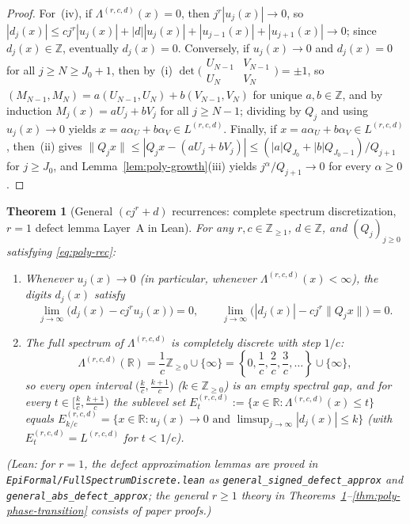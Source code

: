 \documentclass[11pt]{article}
\newtheorem{theorem}{Theorem}
\theoremstyle{definition}
\theoremstyle{remark}
\newcommand{\R}{\mathbb{R}}
\newcommand{\Z}{\mathbb{Z}}
\newcommand{\Lam}{\Lambda}
\begin{document}
\begin{proof}
For~(iv), if $\Lam^{(r,c,d)}(x)=0$, then $j^r|u_j(x)|\to0$, so
$|d_j(x)|\le cj^r|u_j(x)|+|d||u_j(x)|+|u_{j-1}(x)|+|u_{j+1}(x)|\to0$; since
$d_j(x)\in\Z$, eventually $d_j(x)=0$. Conversely, if $u_j(x)\to0$ and $d_j(x)=0$
for all $j\ge N\ge J_0+1$, then by~(i)
$\det\bigl(\begin{smallmatrix}U_{N-1}&V_{N-1}\\U_N&V_N\end{smallmatrix}\bigr)=\pm1$,
so $(M_{N-1},M_N)=a(U_{N-1},U_N)+b(V_{N-1},V_N)$ for unique $a,b\in\Z$, and by
induction $M_j(x)=aU_j+bV_j$ for all $j\ge N-1$; dividing by $Q_j$ and using
$u_j(x)\to0$ yields $x=a\alpha_U+b\alpha_V\in L^{(r,c,d)}$. Finally, if
$x=a\alpha_U+b\alpha_V\in L^{(r,c,d)}$, then~(ii) gives
$\|Q_jx\|\le|Q_jx-(aU_j+bV_j)|\le(|a|Q_{J_0}+|b|Q_{J_0-1})/Q_{j+1}$ for
$j\ge J_0$, and Lemma~\ref{lem:poly-growth}(iii) yields $j^\alpha/Q_{j+1}\to0$
for every $\alpha\ge0$.
\end{proof}

\begin{theorem}[General $(cj^r+d)$ recurrences: complete spectrum discretization,
$r=1$ defect lemma Layer~A in Lean]\label{thm:general-rec}
For any $r,c\in\Z_{\ge1}$, $d\in\Z$, and $(Q_j)_{j\ge0}$ satisfying
\eqref{eq:poly-rec}:
\begin{enumerate}[label=(\roman*),leftmargin=2em]
\item Whenever $u_j(x)\to0$ (in particular, whenever $\Lam^{(r,c,d)}(x)<\infty$),
the digits $d_j(x)$ satisfy
\[
\lim_{j\to\infty}\bigl(d_j(x)-cj^ru_j(x)\bigr)=0,\qquad
\lim_{j\to\infty}\bigl(|d_j(x)|-cj^r\|Q_jx\|\bigr)=0.
\]
\item The full spectrum of $\Lam^{(r,c,d)}$ is completely discrete with step $1/c$:
\[
\Lam^{(r,c,d)}(\R)=\frac{1}{c}\Z_{\ge0}\cup\{\infty\}
=\left\{0,\frac{1}{c},\frac{2}{c},\frac{3}{c},\dots\right\}\cup\{\infty\},
\]
so every open interval $\bigl(\frac{k}{c},\frac{k+1}{c}\bigr)$ ($k\in\Z_{\ge0}$)
is an empty spectral gap, and for every $t\in\bigl[\frac{k}{c},\frac{k+1}{c}\bigr)$
the sublevel set $E_t^{(r,c,d)}:=\{x\in\R:\Lam^{(r,c,d)}(x)\le t\}$ equals
$E_{k/c}^{(r,c,d)}=\{x\in\R:u_j(x)\to0\text{ and }\limsup_{j\to\infty}|d_j(x)|\le k\}$
(with $E_t^{(r,c,d)}=L^{(r,c,d)}$ for $t<1/c$).
\end{enumerate}
(Lean: for $r=1$, the defect approximation lemmas are proved in
\texttt{EpiFormal/\allowbreak Full\allowbreak Spectrum\allowbreak Discrete.lean}
as \texttt{general\_\allowbreak signed\_\allowbreak defect\_\allowbreak approx}
and \texttt{general\_\allowbreak abs\_\allowbreak defect\_\allowbreak approx};
the general $r\ge1$ theory in Theorems~\ref{thm:general-rec}--\ref{thm:poly-phase-transition}
consists of paper proofs.)
\end{theorem}
\end{document}
